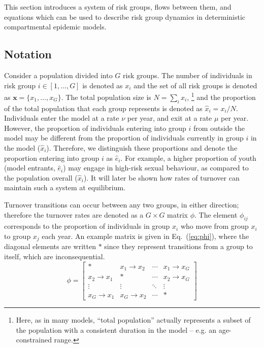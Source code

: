 This section introduces a system of risk groups, flows between them, and equations
which can be used to describe risk group dynamics
in deterministic compartmental epidemic models.
\subsection{Notation}
Consider a population divided into $G$ risk groups.
The number of individuals in risk group $i \in [1, \dots, G]$ is denoted as $x_i$
and the set of all risk groups is denoted as $\bm{x} = \{x_1, \dots, x_G\}$.
The total population size is $N = \sum_i {x_i}$,%
\footnote{Here, as in many models, ``total population'' actually represents
  a subset of the population with a consistent duration in the model --
  e.g. an age-constrained range.}
and the proportion of the total population that each group represents
is denoted as $\hat{x}_i = x_i / N$.
Individuals enter the model at a rate $\nu$ per year,
and exit at a rate $\mu$ per year.
However, the proportion of individuals entering into group $i$ from outside the model
may be different from
the proportion of individuals currently in group $i$ in the model ($\hat{x}_i$).
Therefore, we distinguish these proportions
and denote the proportion entering into group $i$ as $\hat{e}_i$.
For example, a higher proportion of youth (model entrants, $\hat{e}_i$)
may engage in high-risk sexual behaviour,
as compared to the population overall ($\hat{x}_i$).
It will later be shown how rates of turnover can maintain such a system at equilibrium.
\par
Turnover transitions can occur between any two groups, in either direction;
therefore the turnover rates are denoted as a $G \times G$ matrix $\phi$.
The element $\phi_{ij}$ corresponds to the proportion of individuals in group $x_i$
who move from group $x_i$ to group $x_j$ each year.
An example matrix is given in Eq.~(\ref{eq:phi}),
where the diagonal elements are written $*$ since they represent
transitions from a group to itself, which are inconsequential.
\begin{equation}\label{eq:phi}
\phi = \left[\begin{array}{cccc}
	         *          & x_1  \rightarrow x_2 & \cdots & x_1 \rightarrow x_G \\[0.5em]
	x_2 \rightarrow x_1 &          *           & \cdots & x_2 \rightarrow x_G \\[0.5em]
	      \vdots        &        \vdots        & \ddots &       \vdots        \\[0.5em]
	x_G \rightarrow x_1 & x_G \rightarrow x_2  & \cdots &          *
\end{array}\right]
\end{equation}
